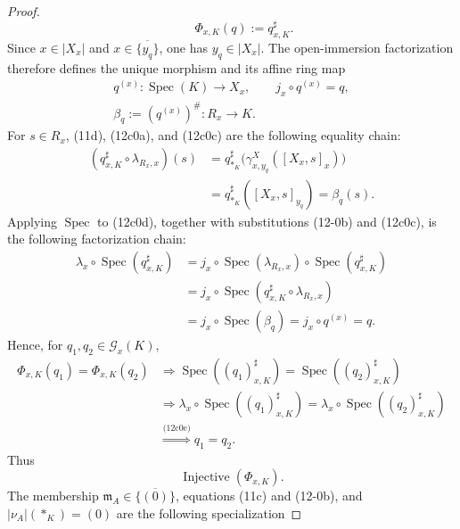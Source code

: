 \begin{proof}
\[    \qquad \Phi_{x,K}(q):=q_{x,K}^\sharp.                       \tag{12c0b}
  \]
  Since $x\in|X_x|$ and $x\in\overline{\{y_q\}}$, one has
  $y_q\in|X_x|$.  The open-immersion factorization therefore defines the
  unique morphism and its affine ring map
  \[
  \begin{gathered}
    q^{(x)}\colon\operatorname{Spec}(K)\to X_x,
    \qquad j_x\circ q^{(x)}=q,\\
    \beta_q:=(q^{(x)})^\#\colon R_x\to K.
  \end{gathered}                                                   \tag{12c0c}
  \]
  For $s\in R_x$, (11d), (12c0a), and (12c0c) are the following equality
  chain:
  \[
  \begin{aligned}
    (q_{x,K}^\sharp\circ\lambda_{R_x,x})(s)
      &=q_{\ast_K}^\sharp
          \bigl(\gamma^X_{x,y_q}([X_x,s]_x)\bigr)\\
      &=q_{\ast_K}^\sharp([X_x,s]_{y_q})
       =\beta_q(s).
  \end{aligned}                                                    \tag{12c0d}
  \]
  Applying $\operatorname{Spec}$ to (12c0d), together with substitutions
  (12-0b) and (12c0c), is the following factorization chain:
  \[
  \begin{aligned}
    \lambda_x\circ\operatorname{Spec}(q_{x,K}^\sharp)
      &=j_x\circ\operatorname{Spec}(\lambda_{R_x,x})
          \circ\operatorname{Spec}(q_{x,K}^\sharp)\\
      &=j_x\circ\operatorname{Spec}
          (q_{x,K}^\sharp\circ\lambda_{R_x,x})\\
      &=j_x\circ\operatorname{Spec}(\beta_q)
       =j_x\circ q^{(x)}=q.
  \end{aligned}                                                    \tag{12c0e}
  \]
  Hence, for $q_1,q_2\in\mathscr G_x(K)$,
  \[
  \begin{aligned}
    \Phi_{x,K}(q_1)=\Phi_{x,K}(q_2)
      &\Longrightarrow
        \operatorname{Spec}((q_1)_{x,K}^\sharp)
          =\operatorname{Spec}((q_2)_{x,K}^\sharp)\\
      &\Longrightarrow
        \lambda_x\circ\operatorname{Spec}((q_1)_{x,K}^\sharp)
          =\lambda_x\circ\operatorname{Spec}((q_2)_{x,K}^\sharp)\\
      &\overset{\text{(12c0e)}}{\Longrightarrow}q_1=q_2.
  \end{aligned}
  \]
  Thus
  \[
    \operatorname{Injective}(\Phi_{x,K}).                        \tag{12c1}
  \]
  The membership $\mathfrak m_A\in\overline{\{(0)\}}$, equations (11c)
  and (12-0b), and $|\nu_A|(\ast_K)=(0)$ are the following specialization

\end{proof}
